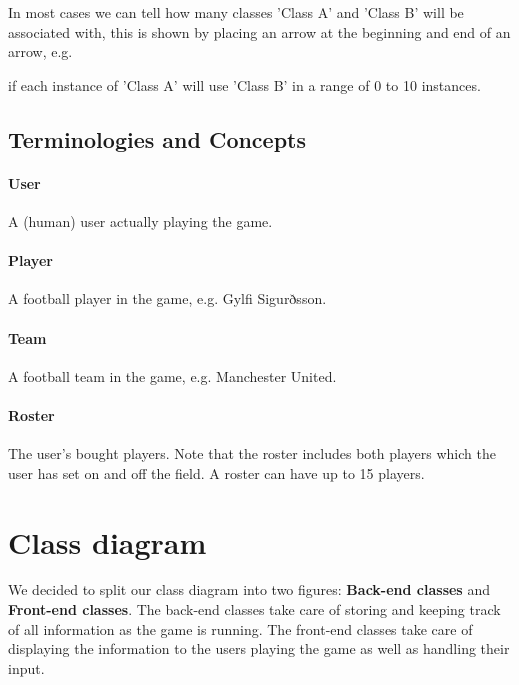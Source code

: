 \documentclass{article}
\begin{document}
In most cases we can tell how many classes 'Class A' and 'Class B' will be associated with, this is shown by placing an arrow at the beginning and end of an arrow, e.g.


if each instance of 'Class A' will use 'Class B' in a range of 0 to 10 instances.

\subsection{Terminologies and Concepts}
\paragraph{User} A (human) user actually playing the game.
\paragraph{Player} A football player in the game, e.g. Gylfi Sigurðsson.
\paragraph{Team} A football team in the game, e.g. Manchester United.
\paragraph{Roster} The user's bought players. Note that the roster includes both players which the user has set on and off the field. A roster can have up to 15 players.

\section{Class diagram}
We decided to split our class diagram into two figures: \textbf{Back-end classes} and \textbf{Front-end classes}. The back-end classes take care of storing and keeping track of all information as the game is running. The front-end classes take care of displaying the information to the users playing the game as well as handling their input.
\end{document}
